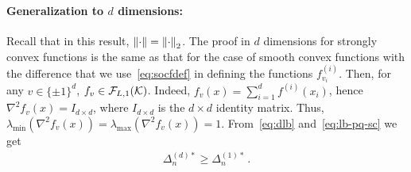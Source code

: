 \paragraph{Generalization to $d$ dimensions:}
Recall that in this result, $\left\|\cdot\right\| = \left\|\cdot\right\|_2$.
The proof in $d$ dimensions for strongly convex functions is the same as that for the case of smooth convex functions
with the difference that we use~\eqref{eq:socfdef} in defining the functions $f^{(i)}_{v_i}$.
Then, for any $v\in \{\pm 1 \}^d$, $f_v\in \mathcal{F}_{L,1}(\mathcal{K})$. Indeed, $f_v(x) = \sum_{i=1}^d f^{(i)}(x_i)$,
hence $\nabla^2 f_v(x) =  I_{d\times d}$, where $I_{d\times d}$ is the $d\times d$ identity matrix.
Thus, $\lambda_{\min}(\nabla^2 f_v(x)) = \lambda_{\max}(\nabla^2 f_v(x)) = 1$.
From~\eqref{eq:dlb} and~\eqref{eq:lb-pq-sc} we get
\begin{align}
\Delta_n^{(d)*} \ge \Delta_n^{(1)*} \,.
\label{eq:lb-pq-d}
\end{align}

%



